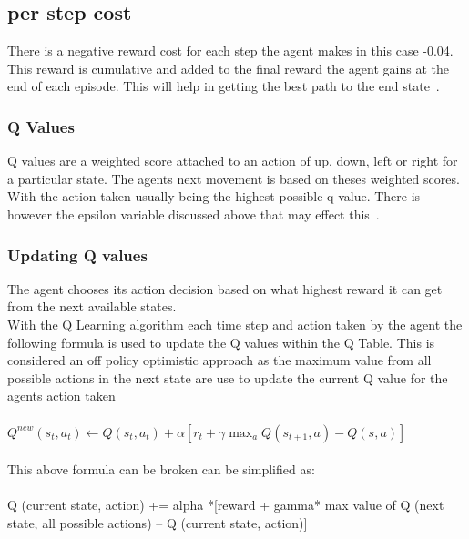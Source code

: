\subsection{per step cost}
There is a negative reward cost for each step the agent makes in this case -0.04.
This reward is cumulative and  added to the final reward the agent gains at the end of each episode. This will help in getting the best path to the end state~\cite{LITTMAN1994157}.
\subsubsection{Q Values}
 Q values are a weighted score attached to an action of up, down, left or right for a particular state.
 The agents next movement is based on theses weighted scores. With the action taken usually being the highest possible q value. There is however the epsilon variable discussed above that may effect this~\cite{LITTMAN1994157}.

\subsubsection{Updating Q values}
The agent chooses its action decision based on what highest reward it can get from the next available states.\\

With the Q Learning algorithm each time step and action taken by the agent the following formula is used to update the Q values within the Q Table. This is considered an off policy optimistic approach as the maximum value from all possible actions in the next state are use to update the current Q value for the agents action taken~\cite{Watkins1992}\\\\
$ Q^{new}(s_{t},a_{t})\leftarrow Q(s_{t},a_{t}) + \alpha[r_{t} + \gamma  \max _{a}Q(s_{t+1},a) - Q(s, a)]$~\cite{Qlearnin52:online}\\\\
This above formula can be broken can be simplified as:\\\\
Q (current state, action) += alpha *[reward + gamma* max value of Q (next state, all possible actions) – Q (current state, action)]\\\\


